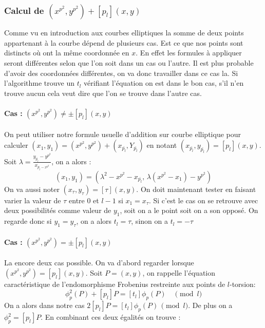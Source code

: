 \documentclass{article}
\begin{document}
\subsubsection{Calcul de $(x^{p^2}, y^{p^2}) + [p_l](x,y)$}

Comme vu en introduction aux courbes elliptiques la somme de deux points appartenant à la courbe dépend de plusieurs cas. Est ce que nos points sont distincts où ont la même coordonnée en $x$. En effet les formules à appliquer seront différentes selon que l'on soit dans un cas ou l'autre. Il est plus probable d'avoir des coordonnées différentes, on va donc travailler dans ce cas la. Si l'algorithme trouve un $t_l$ vérifiant l'équation on est dans le bon cas, s'il n'en trouve aucun cela veut dire que l'on se trouve dans l'autre cas.
\paragraph*{Cas : $(x^{p^2}, y^{p^2}) \ne \pm [p_l](x,y)$}

On peut utiliser notre formule usuelle d'addition sur courbe elliptique pour calculer $(x_1, y_1) = (x^{p^2}, y^{p^2}) + (x_{\bar{p_l}}, Y_{\bar{p_l}})$ en notant $(x_{\bar{p_l}}, y_{\bar{p_l}}) =  [p_l](x,y)$. 
\newline
Soit $\lambda = \frac{y_{\bar{p_l}} - y^{p^2}}{x_{\bar{p_l} - x^{p^2}}}$, on a alors :
\begin{equation}
(x_1, y_1) = (\lambda^2 - x^{p^2} - x_{\bar{p_l}}, \, \lambda (x^{p^2} - x_1) -  y^{p^2})
\end{equation}
On va aussi noter $(x_{\tau}, y_{\tau}) =  [\tau](x,y)$. On doit maintenant tester en faisant varier la valeur de $\tau$ entre $0$ et $l -1$ si $x_1 = x_{\tau}$. Si c'est le cas on se retrouve avec deux possibilités comme valeur de $y_1$, soit on a le point soit on a son opposé. On regarde donc si $y_1 = y_{\tau}$, on a alors $t_l = \tau$, sinon on a $t_l = - \tau$

\paragraph*{Cas : $(x^{p^2}, y^{p^2}) = \pm [p_l](x,y)$}
La encore deux cas possible. On va d'abord regarder lorsque $(x^{p^2}, y^{p^2}) = [p_l](x,y)$. 
\newline
Soit $P=(x,y)$, on rappelle l’équation caractéristique de l'endomorphisme Frobenius restreinte aux points de $l$-torsion: 
\begin{equation}
\phi_p^2(P)  + [p_l]P = [t_{l}] \phi_p(P) \quad \pmod{l}
\end{equation}
On a alors dans notre cas $2[p_l]P = [t_{l}] \phi_p(P) \, \pmod{l}$. De plus on a $\phi_p^2 = [p_l]P$. En combinant ces deux égalités on trouve :
\end{document}
